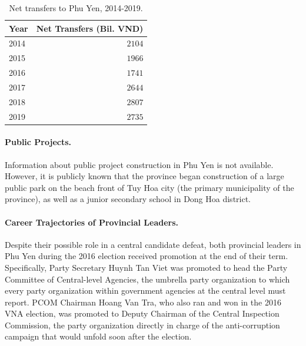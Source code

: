 \documentclass[12pt]{article}
\newcommand{\1}{\mathbbm{1}}
\begin{document}
\begin{table}[]
	\centering
	\caption{Net transfers to Phu Yen, 2014-2019.}
	\label{tab:fund_PhuYen}
	\begin{tabular}{@{}lr@{}}
		\toprule
		Year & \multicolumn{1}{c}{Net Transfers (Bil. VND)}  \\ \midrule
		2014 & $2104$                    \\
		2015 & $1966$                    \\
		2016 & $1741$                    \\ \midrule
		2017 & $2644$                    \\
		2018 & $2807$                   \\
		2019 & $2735$                    \\ \bottomrule
	\end{tabular}
\end{table}



\paragraph{Public Projects.} Information about public project construction in Phu Yen is not available. However, it is publicly known that the province began construction of a large public park on the beach front of Tuy Hoa city (the primary municipality of the province), as well as a junior secondary school in Dong Hoa district.

\paragraph{Career Trajectories of Provincial Leaders.} 

Despite their possible role in a central candidate defeat, both provincial leaders in Phu Yen during the 2016 election received promotion at the end of their term. Specifically, Party Secretary Huynh Tan Viet was promoted to head the Party Committee of Central-level Agencies, the umbrella party organization to which every party organization within government agencies at the central level must report. PCOM Chairman Hoang Van Tra, who also ran and won in the 2016 VNA election, was promoted to Deputy Chairman of the Central Inspection Commission, the party organization directly in charge of the anti-corruption campaign that would unfold soon after the election.
\end{document}
